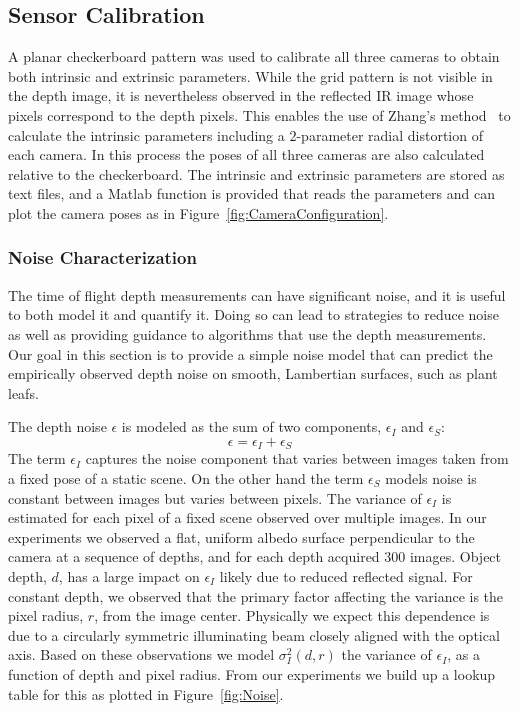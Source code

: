 

\subsection{Sensor Calibration}

A planar checkerboard pattern was used to calibrate all three cameras to obtain both intrinsic and extrinsic parameters. While the grid pattern is not visible in the depth image, it is nevertheless observed in the reflected IR image whose pixels correspond to the depth pixels. This enables the use of Zhang's method~\cite{Zhang2000} to calculate the intrinsic parameters including a $2$-parameter radial distortion of each camera. In this process the poses of all three cameras are also calculated relative to the checkerboard. The intrinsic and extrinsic parameters are stored as text files, and a Matlab function is provided that reads the parameters and can plot the camera poses as in Figure~\ref{fig:CameraConfiguration}.


\subsubsection{Noise Characterization}
\label{sec:bias}

The time of flight depth measurements can have significant noise, and it is useful to both model it and quantify it. Doing so can lead to strategies to reduce noise as well as providing guidance to algorithms that use the depth measurements. Our goal in this section is to provide a simple noise model that can predict the empirically observed depth noise on smooth, Lambertian surfaces, such as plant leafs.

The depth noise $\epsilon$ is modeled as the sum of two components, $\epsilon_I$ and $\epsilon_S$:
\begin{equation}
\epsilon = \epsilon_I + \epsilon_S\label{eq:epsilon}
\end{equation}
The term $\epsilon_I$ captures the noise component that varies between images taken from a fixed pose of a static scene. On the other hand the term $\epsilon_S$ models noise is constant between images but varies between pixels. The variance of $\epsilon_I$ is estimated for each pixel of a fixed scene observed over multiple images. In our experiments we observed a flat, uniform albedo surface perpendicular to the camera at a sequence of depths, and for each depth acquired 300 images. Object depth, $d$, has a large impact on $\epsilon_I$ likely due to reduced reflected signal. For constant depth, we observed that the primary factor affecting the variance is the pixel radius, $r$, from the image center. Physically we expect this dependence is due to a circularly symmetric illuminating beam closely aligned with the optical axis. Based on these observations we model $\sigma_I^2(d,r)$ the variance of $\epsilon_I$, as a function of depth and pixel radius.  From our experiments we build up a lookup table for this as plotted in Figure~\ref{fig:Noise}.

